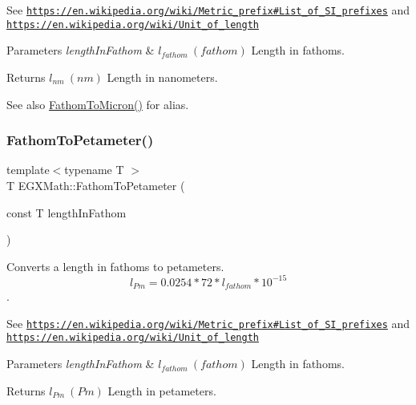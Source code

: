 See \href{https://en.wikipedia.org/wiki/Metric_prefix#List_of_SI_prefixes}{\tt https\+://en.\+wikipedia.\+org/wiki/\+Metric\+\_\+prefix\#\+List\+\_\+of\+\_\+\+S\+I\+\_\+prefixes} and \href{https://en.wikipedia.org/wiki/Unit_of_length}{\tt https\+://en.\+wikipedia.\+org/wiki/\+Unit\+\_\+of\+\_\+length} 
\begin{DoxyParams}{Parameters}
{\em length\+In\+Fathom} & $ l_{fathom}\ (fathom)$ Length in fathoms. \\
\hline
\end{DoxyParams}
\begin{DoxyReturn}{Returns}
$ l_{nm}\ (nm)$ Length in nanometers. 
\end{DoxyReturn}
\begin{DoxySeeAlso}{See also}
\mbox{\hyperlink{group___e_g_x_math-_conversions-_length_conversions-_imperial-_fathom-_non-_s_i_ga491b6bb1b4db49ba22471e9ca9855198}{Fathom\+To\+Micron()}} for alias. 
\end{DoxySeeAlso}
\mbox{\label{group___e_g_x_math-_conversions-_length_conversions-_imperial-_fathom-_s_i_ga1b39213b85524f677fed7b3d5a7052ce}} 
\subsubsection{\texorpdfstring{Fathom\+To\+Petameter()}{FathomToPetameter()}}
{\footnotesize\ttfamily template$<$typename T $>$ \\
T E\+G\+X\+Math\+::\+Fathom\+To\+Petameter (\begin{DoxyParamCaption}\item[{const T}]{length\+In\+Fathom }\end{DoxyParamCaption})}



Converts a length in fathoms to petameters. \[ l_{Pm}=0.0254 * 72 * l_{fathom} * 10^{-15} \]. 

See \href{https://en.wikipedia.org/wiki/Metric_prefix#List_of_SI_prefixes}{\tt https\+://en.\+wikipedia.\+org/wiki/\+Metric\+\_\+prefix\#\+List\+\_\+of\+\_\+\+S\+I\+\_\+prefixes} and \href{https://en.wikipedia.org/wiki/Unit_of_length}{\tt https\+://en.\+wikipedia.\+org/wiki/\+Unit\+\_\+of\+\_\+length} 
\begin{DoxyParams}{Parameters}
{\em length\+In\+Fathom} & $ l_{fathom}\ (fathom)$ Length in fathoms. \\
\hline
\end{DoxyParams}
\begin{DoxyReturn}{Returns}
$ l_{Pm}\ (Pm)$ Length in petameters. 
\end{DoxyReturn}
\mbox{\label{group___e_g_x_math-_conversions-_length_conversions-_imperial-_fathom-_s_i_gad5fe5d3a1a48420dc43cd2826a9b6f71}} 
